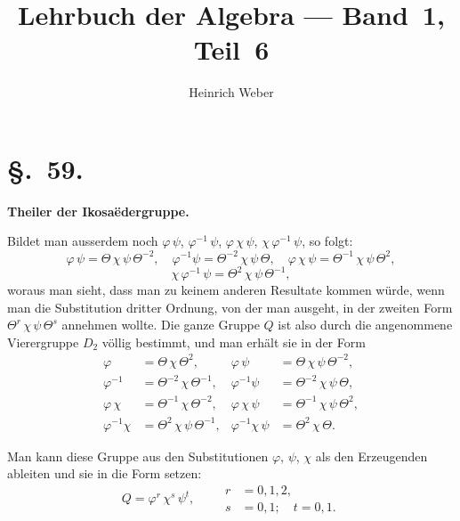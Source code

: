 \documentclass[12pt,a4paper]{article}
\newcommand{\sect}[1]{\section*{{\S.~#1.}}\addcontentsline{toc}{section}{\S.~#1}}
\begin{document}
\title{Lehrbuch der Algebra --- Band~1, Teil~6}
\author{Heinrich Weber}
\date{}
\maketitle

\thispagestyle{empty}
\tableofcontents
\newpage

\sect{59}
\begin{center}
\textbf{Theiler der Ikosaëdergruppe.}
\end{center}
\label{sec:59}
\thispagestyle{fancy}

Bildet man ausserdem noch $\varphi\,\psi$, $\varphi^{-1}\,\psi$, $\varphi\,\chi\,\psi$, $\chi\,\varphi^{-1}\,\psi$, so folgt:
\[
\varphi\,\psi = \Theta\,\chi\,\psi\,\Theta^{-2},\quad
\varphi^{-1}\psi = \Theta^{-2}\,\chi\,\psi\,\Theta,\quad
\varphi\,\chi\,\psi = \Theta^{-1}\,\chi\,\psi\,\Theta^{2},
\]
\[
\chi\,\varphi^{-1}\,\psi = \Theta^{2}\,\chi\,\psi\,\Theta^{-1},
\]
woraus man sieht, dass man zu keinem anderen Resultate kommen würde, wenn man die Substitution dritter Ordnung, von der man ausgeht, in der zweiten Form $\Theta^{r}\,\chi\,\psi\,\Theta^{s}$ annehmen wollte. Die ganze Gruppe $Q$ ist also durch die angenommene Vierergruppe $D_{2}$ völlig bestimmt, und man erhält sie in der Form
\begin{equation}\label{eq:59.3}
\tag{3}
\begin{aligned}
\varphi &= \Theta\,\chi\,\Theta^{2}, & \varphi\,\psi &= \Theta\,\chi\,\psi\,\Theta^{-2},\\
\varphi^{-1} &= \Theta^{-2}\,\chi\,\Theta^{-1}, & \varphi^{-1}\psi &= \Theta^{-2}\,\chi\,\psi\,\Theta,\\
\varphi\,\chi &= \Theta^{-1}\,\chi\,\Theta^{-2}, & \varphi\,\chi\,\psi &= \Theta^{-1}\,\chi\,\psi\,\Theta^{2},\\
\varphi^{-1}\chi &= \Theta^{2}\,\chi\,\psi\,\Theta^{-1}, & \varphi^{-1}\chi\,\psi &= \Theta^{2}\,\chi\,\Theta.
\end{aligned}
\end{equation}

Man kann diese Gruppe aus den Substitutionen $\varphi$, $\psi$, $\chi$ als den Erzeugenden ableiten und sie in die Form setzen:
\begin{equation}\label{eq:59.4}
\tag{4}
Q = \varphi^{r}\,\chi^{s}\,\psi^{t},\qquad
\begin{aligned}
r &= 0,1,2,\\
s &= 0,1;\quad t = 0,1.
\end{aligned}
\end{equation}
\end{document}
